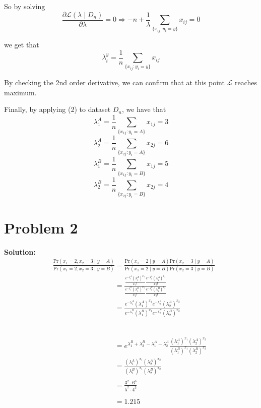 \documentclass[11pt]{article}
\begin{document}
So by solving \[\frac{\partial \mathcal{L}(\lambda \mid D_n)}{\partial \lambda} = 0 \Rightarrow -n + \frac{1}{\lambda}\sum_{\{x_{ij} : y_i = y\}} x_{ij} = 0\]

we get that
\begin{equation}
	\lambda_i^y = \frac{1}{n}\sum_{\{x_{ij} : y_i = y\}} x_{ij}
\end{equation}

By checking the 2nd order derivative, we can confirm that at this point $\mathcal{L}$ reaches maximum.

Finally, by applying (2) to dataset $D_n$, we have that
\[\lambda_1^A = \frac{1}{n}\sum_{\{x_{1j} : y_i = A\}} x_{1j} = 3\]
\[\lambda_2^A = \frac{1}{n}\sum_{\{x_{2j} : y_i = A\}} x_{2j} = 6\]
\[\lambda_1^B = \frac{1}{n}\sum_{\{x_{1j} : y_i = B\}} x_{1j} = 5\]
\[\lambda_2^B = \frac{1}{n}\sum_{\{x_{2j} : y_i = B\}} x_{2j} = 4\]
\section*{Problem 2}
\textbf{Solution:} 
	\begin{align}
		& \frac{\text{Pr}(x_1=2,x_2=3\mid y=A)}{\text{Pr}(x_1=2,x_2=3\mid y=B)} = \frac{\text{Pr}(x_1=2 \mid y=A)\text{Pr}(x_2=3 \mid y=A)}{\text{Pr}(x_1=2 \mid y=B)\text{Pr}(x_2=3 \mid y=B)}\nonumber\\
		& \phantom{\frac{\text{Pr}(x_1=2,x_2=3\mid y=A)}{\text{Pr}(x_1=2,x_2=3\mid y=B)}} = \frac{\frac{e^{-\lambda_1^A}(\lambda_1^A)^{x_1}}{x_1!}\frac{e^{-\lambda_2^A}(\lambda_2^A)^{x_2}}{x_2!}}{\frac{e^{-\lambda_1^B}(\lambda_1^B)^{x_1}}{x_2!}\frac{e^{-\lambda_2^B}(\lambda_2^B)^{x_2}}{x_2!}}\nonumber\\
		& \phantom{\frac{\text{Pr}(x_1=2,x_2=3\mid y=A)}{\text{Pr}(x_1=2,x_2=3\mid y=B)}} = \frac{e^{-\lambda_1^A}(\lambda_1^A)^{x_1}e^{-\lambda_2^A}(\lambda_2^A)^{x_2}}{e^{-\lambda_1^B}(\lambda_1^B)^{x_1}e^{-\lambda_2^B}(\lambda_2^B)^{x_2}}\nonumber
	\end{align}
	\begin{align}
		& \phantom{\frac{\text{Pr}(x_1=2,x_2=3\mid y=A)}{\text{Pr}(x_1=2,x_2=3\mid y=B)} = \frac{\text{Pr}(x_1=2 \mid y=A)\text{Pr}(x_2=3 \mid y=A)}{\text{Pr}(x_1=2 \mid y=B)\text{Pr}(x_2=3 \mid y=B)}}\nonumber\\
		& \phantom{\frac{\text{Pr}(x_1=2,x_2=3\mid y=A)}{\text{Pr}(x_1=2,x_2=3\mid y=B)}} = e^{\lambda_1^B + \lambda_2^B - \lambda_1^A - \lambda_2^A}\frac{(\lambda_1^A)^{x_1}(\lambda_2^A)^{x_2}}{(\lambda_1^B)^{x_1}(\lambda_2^B)^{x_2}}\nonumber\\
		& \phantom{\frac{\text{Pr}(x_1=2,x_2=3\mid y=A)}{\text{Pr}(x_1=2,x_2=3\mid y=B)}} = \frac{(\lambda_1^A)^{x_1}(\lambda_2^A)^{x_2}}{(\lambda_1^B)^{x_1}(\lambda_2^B)^{x_2}}\nonumber\\
		& \phantom{\frac{\text{Pr}(x_1=2,x_2=3\mid y=A)}{\text{Pr}(x_1=2,x_2=3\mid y=B)}} = \frac{3^2 \cdot 6^3}{5^2 \cdot 4^3}\nonumber\\
		& \phantom{\frac{\text{Pr}(x_1=2,x_2=3\mid y=A)}{\text{Pr}(x_1=2,x_2=3\mid y=B)}} = 1.215\nonumber
	\end{align}
\end{document}
